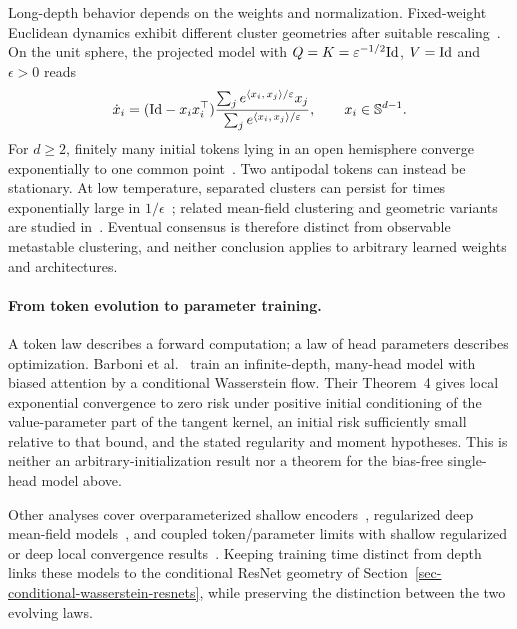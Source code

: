 Long-depth behavior depends on the weights and normalization. Fixed-weight Euclidean dynamics exhibit different cluster geometries after suitable rescaling~\cite{Geshkovski2023EmergenceClusters}. On the unit sphere, the projected model with $Q=K=\varepsilon^{-1/2}\mathrm{Id}$, $V=\mathrm{Id}$ and $\epsilon>0$ reads
\begin{equation}\label{eq-spherical-attention-dynamics}
 \dot x_i=(\mathrm{Id}-x_ix_i^\top)
 \frac{\sum_j e^{\langle x_i,\,x_j\rangle/\varepsilon}x_j}{\sum_j e^{\langle x_i,\,x_j\rangle/\varepsilon}},
 \qquad x_i\in\mathbb S^{d-1}.
\end{equation}
For $d\geq2$, finitely many initial tokens lying in an open hemisphere converge exponentially to one common point~\cite[cone-collapse lemma]{Geshkovski2023MathematicalPerspective}. Two antipodal tokens can instead be stationary. At low temperature, separated clusters can persist for times exponentially large in $1/\epsilon$~\cite{GeshkovskiKoubbiPolyanskiyRigollet2024Metastability}; related mean-field clustering and geometric variants are studied in~\cite{Bruno2024MetastableClustering,Castin2025DynamicsTransformers}. Eventual consensus is therefore distinct from observable metastable clustering, and neither conclusion applies to arbitrary learned weights and architectures.

\paragraph{From token evolution to parameter training.}
A token law describes a forward computation; a law of head parameters describes optimization. Barboni et al.~\cite{BarboniDeHoopFuruyaPeyre2026TrainingTransformers} train an infinite-depth, many-head model with biased attention by a conditional Wasserstein flow. Their Theorem~4 gives local exponential convergence to zero risk under positive initial conditioning of the value-parameter part of the tangent kernel, an initial risk sufficiently small relative to that bound, and the stated regularity and moment hypotheses. This is neither an arbitrary-initialization result nor a theorem for the bias-free single-head model above.

Other analyses cover overparameterized shallow encoders~\cite{WuLiuChrysosCevher2023ShallowTransformers}, regularized deep mean-field models~\cite{Gao2024TrainingTransformers}, and coupled token/parameter limits with shallow regularized or deep local convergence results~\cite{HertyLiu2026MeanFieldTransformers}. Keeping training time distinct from depth links these models to the conditional ResNet geometry of Section~\ref{sec-conditional-wasserstein-resnets}, while preserving the distinction between the two evolving laws.

